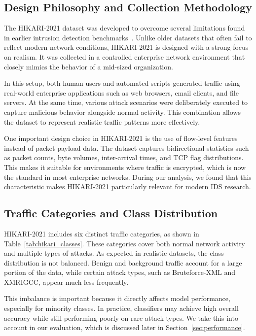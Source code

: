 \documentclass[conference]{IEEEtran}
\begin{document}
\subsection{Design Philosophy and Collection Methodology}

The HIKARI-2021 dataset was developed to overcome several limitations found in earlier intrusion detection benchmarks~\cite{ferriyan2021}. Unlike older datasets that often fail to reflect modern network conditions, HIKARI-2021 is designed with a strong focus on realism. It was collected in a controlled enterprise network environment that closely mimics the behavior of a mid-sized organization.

In this setup, both human users and automated scripts generated traffic using real-world enterprise applications such as web browsers, email clients, and file servers. At the same time, various attack scenarios were deliberately executed to capture malicious behavior alongside normal activity. This combination allows the dataset to represent realistic traffic patterns more effectively.

One important design choice in HIKARI-2021 is the use of flow-level features instead of packet payload data. The dataset captures bidirectional statistics such as packet counts, byte volumes, inter-arrival times, and TCP flag distributions. This makes it suitable for environments where traffic is encrypted, which is now the standard in most enterprise networks. During our analysis, we found that this characteristic makes HIKARI-2021 particularly relevant for modern IDS research.

\subsection{Traffic Categories and Class Distribution}

HIKARI-2021 includes six distinct traffic categories, as shown in Table~\ref{tab:hikari_classes}. These categories cover both normal network activity and multiple types of attacks. As expected in realistic datasets, the class distribution is not balanced. Benign and background traffic account for a large portion of the data, while certain attack types, such as Bruteforce-XML and XMRIGCC, appear much less frequently.

This imbalance is important because it directly affects model performance, especially for minority classes. In practice, classifiers may achieve high overall accuracy while still performing poorly on rare attack types. We take this into account in our evaluation, which is discussed later in Section~\ref{sec:performance}.
\end{document}
